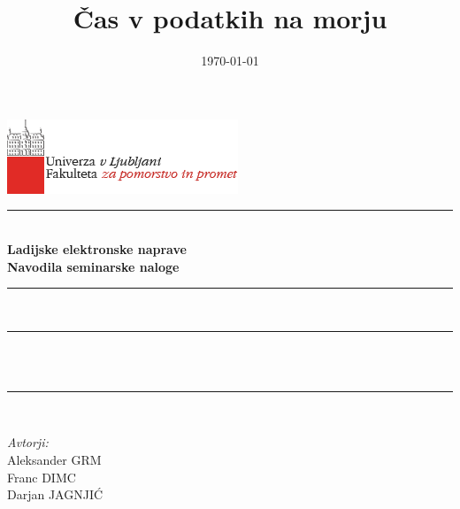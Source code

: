 \documentclass[11pt]{article}
\title{Čas v podatkih na morju}
\date{\today}
\author{}
\makeatletter
\let\thetitle\@title
\let\thedate\@date
\makeatother
\begin{document}
	
	
	\begin{titlepage}
		\centering
		\vspace*{-2cm}
		\includegraphics[scale = 0.75]{logo_FPP.png}\\[1.0 cm]
		
		\rule{\linewidth}{1 mm} \\[0.4 cm]
		{ \huge \bfseries Ladijske elektronske naprave} \\[0.5 cm]
		{ \Large \bfseries Navodila seminarske naloge}
		\rule{\linewidth}{1 mm} \\[1 cm]
		
		\rule{\linewidth}{0.5 mm} \\[0.4 cm]
		{ \large \bfseries \thetitle}\\[0.0 cm]
		\rule{\linewidth}{0.5 mm} \\[2 cm]
		
		\begin{minipage}{0.4\textwidth}
			\begin{flushleft} \large
				\emph{Avtorji:}\\[0.2 cm]
				Aleksander GRM\\
				Franc DIMC\\
				Darjan JAGNJIĆ
			\end{flushleft}
		\end{minipage}~
		\begin{minipage}{0.4\textwidth}
			\begin{flushright}
			\end{flushright}
		\end{minipage}\\[2 cm]
		
		\vfill
		
		{\large \thedate}\\[2 cm]
		
		
		
	\end{titlepage}
	
	
	\tableofcontents
	\pagebreak
	
\end{document}
